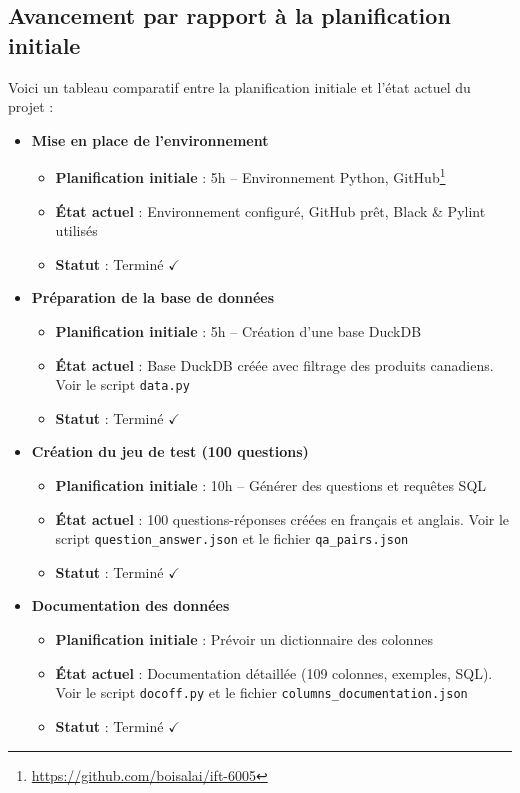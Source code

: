 \documentclass[a4paper,11pt]{article}
\begin{document}
\subsection{Avancement par rapport à la planification initiale}

Voici un tableau comparatif entre la planification initiale et l'état actuel du projet :

\begin{itemize}
    \item \textbf{Mise en place de l'environnement}
    \begin{itemize}
        \item \textbf{Planification initiale} : 5h -- Environnement Python, GitHub\footnote{\url{https://github.com/boisalai/ift-6005}}
        \item \textbf{État actuel} : Environnement configuré, GitHub prêt, Black \& Pylint utilisés
        \item \textbf{Statut} : Terminé $\checkmark$
    \end{itemize}
    
    \item \textbf{Préparation de la base de données}
    \begin{itemize}
        \item \textbf{Planification initiale} : 5h -- Création d'une base DuckDB
        \item \textbf{État actuel} : Base DuckDB créée avec filtrage des produits canadiens. Voir le script \texttt{data.py}
        \item \textbf{Statut} : Terminé $\checkmark$
      \end{itemize}
    
    \item \textbf{Création du jeu de test (100 questions)}
    \begin{itemize}
        \item \textbf{Planification initiale} : 10h -- Générer des questions et requêtes SQL
        \item \textbf{État actuel} : 100 questions-réponses créées en français et anglais. Voir le script \texttt{question\_answer.json} et le fichier \texttt{qa\_pairs.json}
        \item \textbf{Statut} : Terminé $\checkmark$
    \end{itemize}
    
    \item \textbf{Documentation des données}
    \begin{itemize}
        \item \textbf{Planification initiale} : Prévoir un dictionnaire des colonnes
        \item \textbf{État actuel} : Documentation détaillée (109 colonnes, exemples, SQL). Voir le script \texttt{docoff.py} et le fichier \texttt{columns\_documentation.json}
        \item \textbf{Statut} : Terminé $\checkmark$
    \end{itemize}
    

\end{itemize}
\end{document}
